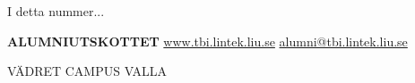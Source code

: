 \documentclass[10pt,final,hyphenatedtitles]{papertex}
\renewcommand{\todo}[1]{}
\begin{document}
\begin{frontpage}
\begin{indexblock}{I detta nummer...}




\end{indexblock}


\todo{ta bort, sätt in logo, hemsida, kontaktuppgifter}
\begin{authorblock}
\textbf{ALUMNIUTSKOTTET}
\url{www.tbi.lintek.liu.se}
\href{mailto:alumni@tbi.lintek.liu.se}{alumni@tbi.lintek.liu.se}
\end{authorblock}



\begin{weatherblock}{VÄDRET CAMPUS VALLA}
\end{weatherblock}
\end{frontpage}



\newsection{}



\newssep



\newssep



\clearpage


\clearpage


\newssep



\newssep



\clearpage


\end{document}
